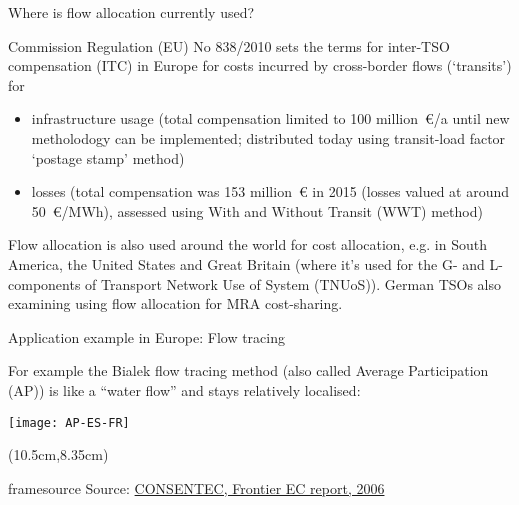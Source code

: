 \documentclass[10pt,aspectratio=169,dvipsnames]{beamer}
\newcommand{\source}[1]{\begin{textblock*}{5cm}(10.5cm,8.35cm)
    \begin{beamercolorbox}[ht=0.5cm,right]{framesource}
        \usebeamerfont{framesource}\usebeamercolor[fg]{framesource} Source: {#1}
    \end{beamercolorbox}
\end{textblock*}}
\let\olditem\item
\renewcommand{\item}{%
\olditem\vspace{5pt}}
\begin{document}
\begin{frame}{Where is flow allocation currently used?}

  Commission Regulation (EU) No 838/2010 sets the terms for inter-TSO compensation (ITC) in Europe for costs incurred by
  cross-border flows (`transits') for
  \begin{itemize}
  \item \alert{infrastructure usage} (total compensation limited to 100
    million~\euro/a until new metholodogy can be implemented; distributed today using
    transit-load factor `postage stamp' method)
  \item \alert{losses} (total compensation was 153 million~\euro{} in 2015 (losses valued at around 50~\euro/MWh),  assessed using With and Without Transit (WWT) method)
  \end{itemize}

  Flow allocation is also used around the world for cost allocation,
  e.g. in South America, the United States and Great Britain (where it's used for
  the G- and L-components of Transport Network Use of System (TNUoS)). German TSOs also examining using flow allocation for
  MRA cost-sharing.




\end{frame}



\begin{frame}{Application example in Europe: Flow tracing}

  For example the Bialek \alert{flow tracing method} (also called Average
  Participation (AP)) is like a ``water flow'' and stays relatively
  \alert{localised}:

  \vspace{.3cm}

  \centering
  \texttt{[image: AP-ES-FR]}

    \source{\href{https://ec.europa.eu/energy/sites/ener/files/documents/2006_03_tso_compensation_mechanism.pdf}{CONSENTEC, Frontier EC report, 2006}}

\end{frame}
\end{document}
